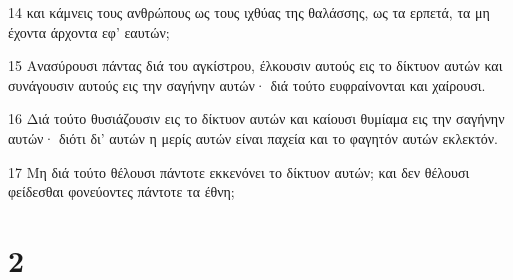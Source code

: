 \par 14 και κάμνεις τους ανθρώπους ως τους ιχθύας της θαλάσσης, ως τα ερπετά, τα μη έχοντα άρχοντα εφ' εαυτών;
\par 15 Ανασύρουσι πάντας διά του αγκίστρου, έλκουσιν αυτούς εις το δίκτυον αυτών και συνάγουσιν αυτούς εις την σαγήνην αυτών· διά τούτο ευφραίνονται και χαίρουσι.
\par 16 Διά τούτο θυσιάζουσιν εις το δίκτυον αυτών και καίουσι θυμίαμα εις την σαγήνην αυτών· διότι δι' αυτών η μερίς αυτών είναι παχεία και το φαγητόν αυτών εκλεκτόν.
\par 17 Μη διά τούτο θέλουσι πάντοτε εκκενόνει το δίκτυον αυτών; και δεν θέλουσι φείδεσθαι φονεύοντες πάντοτε τα έθνη;

\chapter{2}

